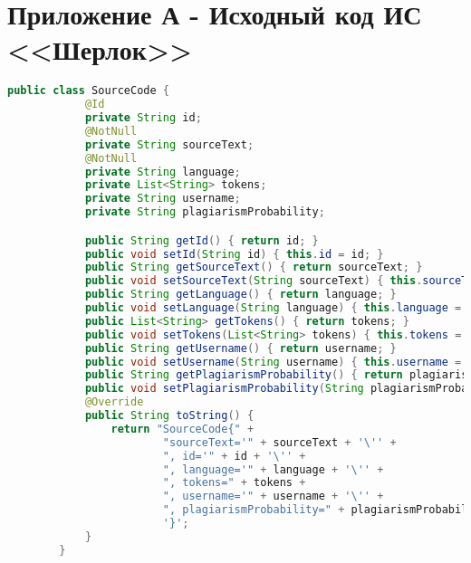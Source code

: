 \section*{Приложение А - Исходный код ИС <<Шерлок>>}


    \begin{lstlisting}[language=java]
        public class SourceCode {
            @Id
            private String id;
            @NotNull
            private String sourceText;
            @NotNull
            private String language;
            private List<String> tokens;
            private String username;
            private String plagiarismProbability;

            public String getId() { return id; }
            public void setId(String id) { this.id = id; }
            public String getSourceText() { return sourceText; }
            public void setSourceText(String sourceText) { this.sourceText = sourceText; }
            public String getLanguage() { return language; }
            public void setLanguage(String language) { this.language = language; }
            public List<String> getTokens() { return tokens; }
            public void setTokens(List<String> tokens) { this.tokens = tokens; }
            public String getUsername() { return username; }
            public void setUsername(String username) { this.username = username; }
            public String getPlagiarismProbability() { return plagiarismProbability; }
            public void setPlagiarismProbability(String plagiarismProbability) { this.plagiarismProbability = plagiarismProbability; }
            @Override
            public String toString() {
                return "SourceCode{" +
                        "sourceText='" + sourceText + '\'' +
                        ", id='" + id + '\'' +
                        ", language='" + language + '\'' +
                        ", tokens=" + tokens +
                        ", username='" + username + '\'' +
                        ", plagiarismProbability=" + plagiarismProbability +
                        '}';
            }
        }
    \end{lstlisting}

